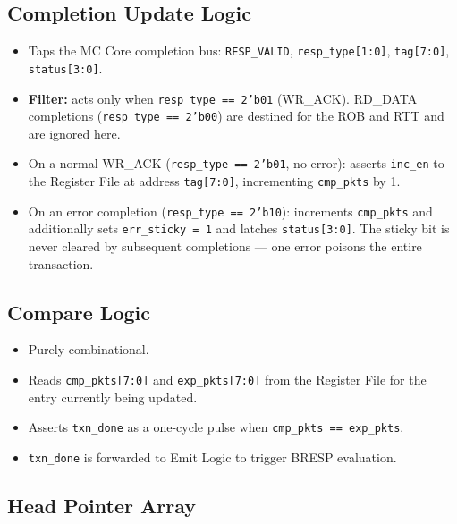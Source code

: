 \documentclass[11pt,a4paper]{article}
\begin{document}
\subsection{Completion Update Logic}

\begin{itemize}
  \item Taps the MC Core completion bus: \texttt{RESP\_VALID},
        \texttt{resp\_type[1:0]}, \texttt{tag[7:0]},
        \texttt{status[3:0]}.
  \item \textbf{Filter:} acts only when \texttt{resp\_type == 2'b01}
        (WR\_ACK). RD\_DATA completions (\texttt{resp\_type == 2'b00})
        are destined for the ROB and RTT and are ignored here.
  \item On a normal WR\_ACK (\texttt{resp\_type == 2'b01}, no error):
        asserts \texttt{inc\_en} to the Register File at address
        \texttt{tag[7:0]}, incrementing \texttt{cmp\_pkts} by 1.
  \item On an error completion (\texttt{resp\_type == 2'b10}):
        increments \texttt{cmp\_pkts} and additionally sets
        \texttt{err\_sticky = 1} and latches \texttt{status[3:0]}.
        The sticky bit is never cleared by subsequent completions —
        one error poisons the entire transaction.
\end{itemize}

\subsection{Compare Logic}

\begin{itemize}
  \item Purely combinational.
  \item Reads \texttt{cmp\_pkts[7:0]} and \texttt{exp\_pkts[7:0]} from
        the Register File for the entry currently being updated.
  \item Asserts \texttt{txn\_done} as a one-cycle pulse when
        \texttt{cmp\_pkts == exp\_pkts}.
  \item \texttt{txn\_done} is forwarded to Emit Logic to trigger BRESP
        evaluation.
\end{itemize}

\subsection{Head Pointer Array}
\end{document}
